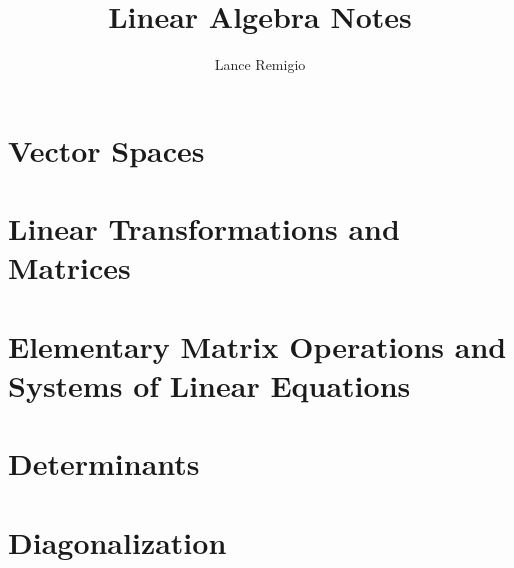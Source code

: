 \documentclass[11pt,a4paper]{book}
\title{Linear Algebra Notes}
\author{Lance Remigio}
\begin{document}
\maketitle
\tableofcontents
\listoftheorems[ignoreall,show={theorem,defn}]
\chapter{Vector Spaces}











\chapter{Linear Transformations and Matrices}











\chapter{Elementary Matrix Operations and Systems of Linear Equations}





\chapter{Determinants}







\chapter{Diagonalization}




\end{document}
